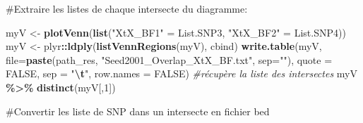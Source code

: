 \documentclass[
  openany]{book}
\newenvironment{Shaded}{\begin{snugshade}}{\end{snugshade}}
\newcommand{\AttributeTok}[1]{\textcolor[rgb]{0.13,0.29,0.53}{#1}}
\newcommand{\CommentTok}[1]{\textcolor[rgb]{0.56,0.35,0.01}{\textit{#1}}}
\newcommand{\ConstantTok}[1]{\textcolor[rgb]{0.56,0.35,0.01}{#1}}
\newcommand{\DecValTok}[1]{\textcolor[rgb]{0.00,0.00,0.81}{#1}}
\newcommand{\FunctionTok}[1]{\textcolor[rgb]{0.13,0.29,0.53}{\textbf{#1}}}
\newcommand{\NormalTok}[1]{#1}
\newcommand{\OtherTok}[1]{\textcolor[rgb]{0.56,0.35,0.01}{#1}}
\newcommand{\SpecialCharTok}[1]{\textcolor[rgb]{0.81,0.36,0.00}{\textbf{#1}}}
\newcommand{\StringTok}[1]{\textcolor[rgb]{0.31,0.60,0.02}{#1}}
\theoremstyle{definition}
\theoremstyle{definition}
\theoremstyle{definition}
\theoremstyle{definition}
\theoremstyle{remark}
\begin{document}
\#Extraire les listes de chaque intersecte du diagramme:

\begin{Shaded}
\begin{Highlighting}[]
\NormalTok{myV }\OtherTok{\textless{}{-}} \FunctionTok{plotVenn}\NormalTok{(}\FunctionTok{list}\NormalTok{(}\StringTok{"XtX\_BF1"} \OtherTok{=}\NormalTok{ List.SNP3, }\StringTok{"XtX\_BF2"} \OtherTok{=}\NormalTok{ List.SNP4))}
\NormalTok{myV }\OtherTok{\textless{}{-}}\NormalTok{ plyr}\SpecialCharTok{::}\FunctionTok{ldply}\NormalTok{(}\FunctionTok{listVennRegions}\NormalTok{(myV), cbind)}
\FunctionTok{write.table}\NormalTok{(myV, }\AttributeTok{file=}\FunctionTok{paste}\NormalTok{(path\_res, }\StringTok{"Seed2001\_Overlap\_XtX\_BF.txt"}\NormalTok{, }\AttributeTok{sep=}\StringTok{""}\NormalTok{), }\AttributeTok{quote =} \ConstantTok{FALSE}\NormalTok{, }\AttributeTok{sep =} \StringTok{"}\SpecialCharTok{\textbackslash{}t}\StringTok{"}\NormalTok{, }\AttributeTok{row.names =} \ConstantTok{FALSE}\NormalTok{)}
\CommentTok{\#récupère la liste des intersectes}
\NormalTok{myV }\SpecialCharTok{\%\textgreater{}\%} \FunctionTok{distinct}\NormalTok{(myV[,}\DecValTok{1}\NormalTok{])}
\end{Highlighting}
\end{Shaded}

\#Convertir les liste de SNP dans un intersecte en fichier bed
\end{document}
